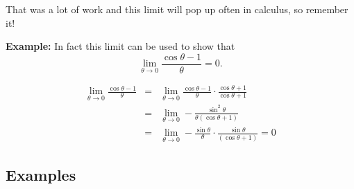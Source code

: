 \documentclass[12pt,addpoints, answers, fleqn]{exam}
\begin{document}
That was a lot of work and this limit will pop up often in calculus, so remember it!

\textbf{Example:} In fact this limit can be used to show that
\[
\mathop {\lim }\limits_{ \theta \to 0} \frac{ \cos \theta - 1}{\theta} = 0.
\]



\begin{solution}
\begin{eqnarray*}
\lim_{ \theta \to 0} \frac{ \cos \theta - 1}{\theta} &=& \lim_{ \theta \to 0} \frac{ \cos \theta - 1}{\theta} \cdot \frac{\cos \theta + 1}{\cos \theta + 1} \\
&=& \lim_{ \theta \to 0} - \frac{\sin^2 \theta}{\theta \left( \cos \theta + 1 \right)}\\
&=& \lim_{ \theta \to 0} - \frac{\sin \theta}{\theta} \cdot \frac{\sin \theta}{ \left( \cos \theta + 1 \right)} = 0
\end{eqnarray*}

\end{solution}


\subsection{Examples}
\end{document}
